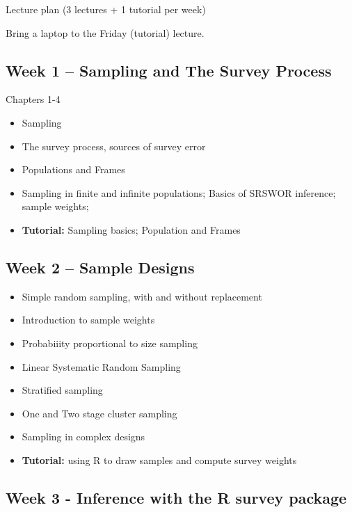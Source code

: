 \documentclass[
]{book}
\providecommand{\tightlist}{%
  \setlength{\itemsep}{0pt}\setlength{\parskip}{0pt}}
\begin{document}
Lecture plan (3 lectures + 1 tutorial per week)

Bring a laptop to the Friday (tutorial) lecture.

\subsection*{Week 1 -- Sampling and The Survey Process}\label{week-1-sampling-and-the-survey-process}

Chapters 1-4

\begin{itemize}
\tightlist
\item
  Sampling
\item
  The survey process, sources of survey error
\item
  Populations and Frames
\item
  Sampling in finite and infinite populations;
  Basics of SRSWOR inference; sample weights;
\item
  \textbf{Tutorial:} Sampling basics; Population and Frames
\end{itemize}

\subsection*{Week 2 -- Sample Designs}\label{week-2-sample-designs}

\begin{itemize}
\tightlist
\item
  Simple random sampling, with and without replacement
\item
  Introduction to sample weights
\item
  Probabiiity proportional to size sampling
\item
  Linear Systematic Random Sampling
\item
  Stratified sampling
\item
  One and Two stage cluster sampling
\item
  Sampling in complex designs
\item
  \textbf{Tutorial:} using R to draw samples and compute survey weights
\end{itemize}

\subsection*{Week 3 - Inference with the R survey package}\label{week-3---inference-with-the-r-survey-package}
\end{document}
